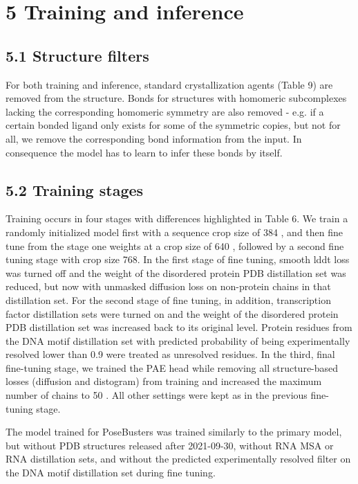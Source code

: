 \documentclass[10pt]{article}
\begin{document}
\section*{5 Training and inference}
\subsection*{5.1 Structure filters}
For both training and inference, standard crystallization agents (Table 9) are removed from the structure. Bonds for structures with homomeric subcomplexes lacking the corresponding homomeric symmetry are also removed - e.g. if a certain bonded ligand only exists for some of the symmetric copies, but not for all, we remove the corresponding bond information from the input. In consequence the model has to learn to infer these bonds by itself.

\subsection*{5.2 Training stages}
Training occurs in four stages with differences highlighted in Table 6. We train a randomly initialized model first with a sequence crop size of 384 , and then fine tune from the stage one weights at a crop size of 640 , followed by a second fine tuning stage with crop size 768. In the first stage of fine tuning, smooth lddt loss was turned off and the weight of the disordered protein PDB distillation set was reduced, but now with unmasked diffusion loss on non-protein chains in that distillation set. For the second stage of fine tuning, in addition, transcription factor distillation sets were turned on and the weight of the disordered protein PDB distillation set was increased back to its original level. Protein residues from the DNA motif distillation set with predicted probability of being experimentally resolved lower than 0.9 were treated as unresolved residues. In the third, final fine-tuning stage, we trained the PAE head while removing all structure-based losses (diffusion and distogram) from training and increased the maximum number of chains to 50 . All other settings were kept as in the previous fine-tuning stage.

The model trained for PoseBusters was trained similarly to the primary model, but without PDB structures released after 2021-09-30, without RNA MSA or RNA distillation sets, and without the predicted experimentally resolved filter on the DNA motif distillation set during fine tuning.
\end{document}
